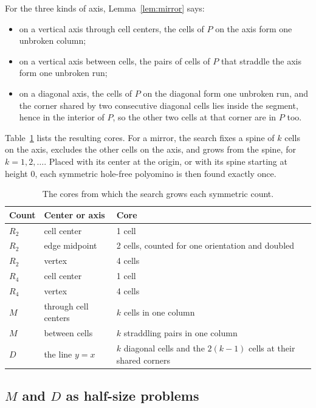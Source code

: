 \documentclass[11pt]{a000104}
\numberwithin{equation}{section}
\begin{document}
For the three kinds of axis, Lemma~\ref{lem:mirror} says:
\begin{itemize}
  \item on a vertical axis through cell centers, the cells of $P$ on the axis form one unbroken column;
  \item on a vertical axis between cells, the pairs of cells of $P$ that straddle the axis form one unbroken run;
  \item on a diagonal axis, the cells of $P$ on the diagonal form one unbroken run, and the corner shared by two consecutive diagonal cells lies inside the segment, hence in the interior of $P$, so the other two cells at that corner are in $P$ too.
\end{itemize}

Table~\ref{tab:cores} lists the resulting cores.
For a mirror, the search fixes a spine of $k$ cells on the axis, excludes the other cells on the axis, and grows from the spine, for $k = 1, 2, \ldots$.
Placed with its center at the origin, or with its spine starting at height $0$, each symmetric hole-free polyomino is then found exactly once.

\begin{table}[!htbp]
  \centering
  \begin{tabularx}{\textwidth}{llX}
    \toprule
    Count & Center or axis & Core \\
    \midrule
    $R_2$ & cell center & 1 cell \\
    $R_2$ & edge midpoint & 2 cells, counted for one orientation and doubled \\
    $R_2$ & vertex & 4 cells \\
    $R_4$ & cell center & 1 cell \\
    $R_4$ & vertex & 4 cells \\
    $M$ & through cell centers & $k$ cells in one column \\
    $M$ & between cells & $k$ straddling pairs in one column \\
    $D$ & the line $y = x$ & $k$ diagonal cells and the $2(k-1)$ cells at their shared corners \\
    \bottomrule
  \end{tabularx}
  \caption{The cores from which the search grows each symmetric count.}
  \label{tab:cores}
\end{table}

\subsection{\texorpdfstring{$M$ and $D$}{M and D} as half-size problems}\label{sec:halfsize}
\end{document}
